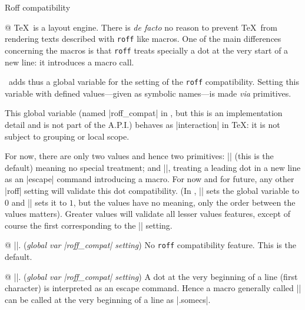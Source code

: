 
\enddiv %

\begindiv Roff compatibility

@ \TeX\ is a layout engine. There is {\it de facto} no reason to
prevent \TeX\ from rendering texts described with {\tt roff} like
macros. One of the main differences concerning the macros is that
{\tt roff} treats specially a dot at the very start of a new line: it
introduces a macro call.

\Prote\ adds thus a global variable for the setting of the {\tt roff}
compatibility. Setting this variable with defined values---given as
symbolic names---is made {\it via} primitives.

This global variable (named |roff_compat| in \Prote, but this is an
implementation detail and is not part of the A.P.I.) behaves as
|interaction| in \TeX: it is not subject to grouping or local scope.

For now, there are only two values and hence two primitives:
|\noroffcompat| (this is the default) meaning no special treatment; and
|\roffdot|, treating a leading dot in a new line as an |escape|
command introducing a macro. For now and for future, any other
|roff| setting will validate this dot compatibility. (In \Prote,
|\noroffcompat| sets the global variable to $0$ and |\roffdot| sets
it to $1$, but the values have no meaning, only the order between the
values matters). Greater values will validate all lesser values
features, except of course the first corresponding to the 
|\noroffcompat| setting.

@ |\noroffcompat|. ({\sl global var |roff_compat| setting})\enskip
No {\tt roff} compatibility feature. This is the default.

@ |\roffdot|. ({\sl global var |roff_compat| setting})\enskip
A dot at the very beginning of a line (first character) is interpreted
as an escape command. Hence a macro generally called |\somecs| can
be called at the very beginning of a line as |.somecs|.

\enddiv %

\enddiv %

\bye

